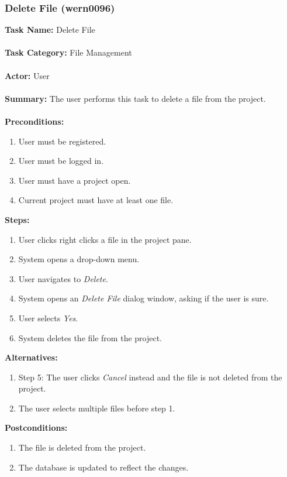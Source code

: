 \documentclass[11pt]{report}
\begin{document}
\newpage

\subsubsection{Delete File (wern0096)}
\begin{framed}
	\noindent\textbf{Task Name:} Delete File \\ \\
	\textbf{Task Category:} File Management \\ \\
	\textbf{Actor:} User \\ \\
	\textbf{Summary:} The user performs this task to delete a file from the project. \\ \\
	\textbf{Preconditions:} 
	\begin{enumerate}
		\item User must be registered.
		\item User must be logged in.
		\item User must have a project open.
		\item Current project must have at least one file.
	\end{enumerate}
	\textbf{Steps:}
	\begin{enumerate}
		\item User clicks right clicks a file in the project pane.
		\item System opens a drop-down menu.
		\item User navigates to \textit{Delete}.
		\item System opens an \textit{Delete File} dialog window, asking if the user is sure.
		\item User selects \textit{Yes}.
		\item System deletes the file from the project.
	\end{enumerate}
	\textbf{Alternatives:} 
	\begin{enumerate}
		\item Step 5: The user clicks \textit{Cancel} instead and the file is not deleted from the project.
		\item The user selects multiple files before step 1.
	\end{enumerate}
	\textbf{Postconditions:}
	\begin{enumerate}
		\item The file is deleted from the project.
		\item The database is updated to reflect the changes.
	\end{enumerate}
\end{framed} 
\end{document}
